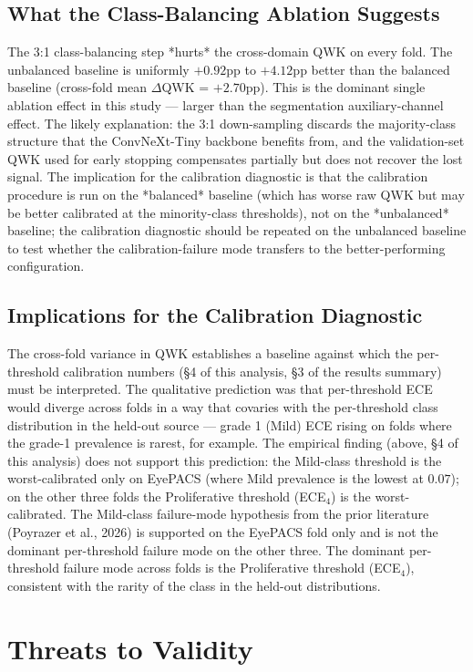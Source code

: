 \documentclass[11pt]{article}
\begin{document}
\subsection{What the Class-Balancing Ablation Suggests}
The 3:1 class-balancing step *hurts* the cross-domain QWK on every fold. The unbalanced baseline is uniformly $+0.92$pp to $+4.12$pp better than the balanced baseline (cross-fold mean $\Delta$QWK = $+2.70$pp). This is the dominant single ablation effect in this study --- larger than the segmentation auxiliary-channel effect. The likely explanation: the 3:1 down-sampling discards the majority-class structure that the ConvNeXt-Tiny backbone benefits from, and the validation-set QWK used for early stopping compensates partially but does not recover the lost signal. The implication for the calibration diagnostic is that the calibration procedure is run on the *balanced* baseline (which has worse raw QWK but may be better calibrated at the minority-class thresholds), not on the *unbalanced* baseline; the calibration diagnostic should be repeated on the unbalanced baseline to test whether the calibration-failure mode transfers to the better-performing configuration.

\subsection{Implications for the Calibration Diagnostic}
The cross-fold variance in QWK establishes a baseline against which the per-threshold calibration numbers (\S4 of this analysis, §3 of the results summary) must be interpreted. The qualitative prediction was that per-threshold ECE would diverge across folds in a way that covaries with the per-threshold class distribution in the held-out source --- grade 1 (Mild) ECE rising on folds where the grade-1 prevalence is rarest, for example. The empirical finding (above, \S4 of this analysis) does not support this prediction: the Mild-class threshold is the worst-calibrated only on EyePACS (where Mild prevalence is the lowest at $0.07$); on the other three folds the Proliferative threshold (ECE$_4$) is the worst-calibrated. The Mild-class failure-mode hypothesis from the prior literature (Poyrazer et al., 2026) is supported on the EyePACS fold only and is not the dominant per-threshold failure mode on the other three. The dominant per-threshold failure mode across folds is the Proliferative threshold (ECE$_4$), consistent with the rarity of the class in the held-out distributions.

\section{Threats to Validity}
\end{document}
